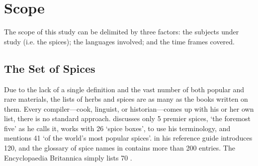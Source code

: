 


\section{Scope}

The scope of this study can be delimited by three factors: the subjects under study (i.e. the spices); the languages involved; and the time frames covered.

\subsection{The Set of Spices}

Due to the lack of a single definition and the vast number of both popular and rare materials, the lists of herbs and spices are as many as the books written on them. Every compiler---cook, linguist, or historian---comes up with his or her own list, there is no standard approach. \textcite{czarra_spices_2009} discusses only 5 premier spices, `the foremost five' as he calls it, \textcite{nabhan_cumin_2014} works with 26 `spice boxes', to use his terminology, and \textcite{rosengarten_book_1973} mentions 41 `of the world's most popular spices'. \textcite{van_wyk_culinary_2014} in his reference guide introduces 120, and the glossary of spice names in \textcite{dalby_dangerous_2000} contains more than 200 entries. The Encyclopaedia Britannica simply lists 70 \autocite{petruzzello_list_nodate}. 

